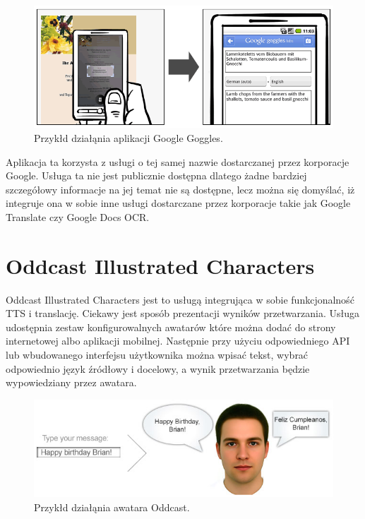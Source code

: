\begin{figure}[!h]
	\centering
	\includegraphics[scale=0.5]{google_goggles.png}
	\caption{Przykłd działąnia aplikacji Google Goggles\cite{googlegoggles}. }\label{fig:google_goggles}
\end{figure}

Aplikacja ta korzysta z usługi o tej samej nazwie dostarczanej przez korporacje Google. Usługa ta nie jest publicznie dostępna dlatego żadne bardziej szczegółowy informacje na jej temat nie są dostępne, lecz można się domyślać, iż integruje ona w sobie inne usługi dostarczane przez korporacje takie jak Google Translate czy Google Docs OCR. 

\section {Oddcast Illustrated Characters}

Oddcast Illustrated Characters\cite{oddcasts} jest to usługą integrująca w sobie funkcjonalność TTS i translację. Ciekawy jest sposób prezentacji wyników przetwarzania. Usługa udostępnia zestaw konfigurowalnych awatarów które można dodać do strony internetowej albo aplikacji mobilnej. Następnie przy użyciu odpowiedniego API lub wbudowanego interfejsu użytkownika można wpisać tekst, wybrać odpowiednio język źródłowy i docelowy, a wynik przetwarzania będzie wypowiedziany przez awatara.

\begin{figure}[!h]
	\centering
	\includegraphics[scale=0.60]{oddcast.png}
	\caption{Przykłd działąnia awatara Oddcast\cite{oddcasts}. }\label{fig:oddcast}
\end{figure}

